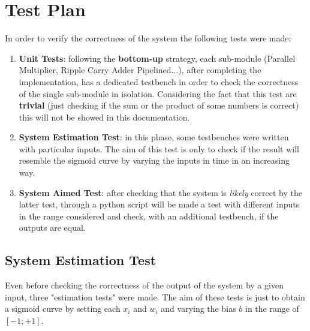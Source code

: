 \section{Test Plan}
In order to verify the correctness of the system the following tests were made:
\begin{enumerate}
	\item \textbf{Unit Tests}: following the \textbf{bottom-up} strategy, each sub-module (Parallel Multiplier, Ripple Carry Adder Pipelined...), after completing the implementation, has a dedicated testbench in order to check the correctness of the single sub-module in isolation. Considering the fact that this test are \textbf{trivial} (just checking if the sum or the product of some numbers is correct) this will not be showed in this documentation.
	\item \textbf{System Estimation Test}: in this phase, some testbenches were written with particular inputs. The aim of this test is only to check if the result will resemble the sigmoid curve by varying the inputs in time in an increasing way.
	\item \textbf{System Aimed Test}: after checking that the system is \textit{likely} correct by the latter test, through a python script will be made a test with different inputs in the range considered and check, with an additional testbench, if the outputs are equal.
\end{enumerate}
\subsection{System Estimation Test}
Even before checking the correctness of the output of the system by a given input, three "estimation tests" were made. The aim of these tests is just to obtain a sigmoid curve by setting each $x_{i}$ and $w_{i}$ and varying the bias $b$ in the range of $[-1; +1]$.
